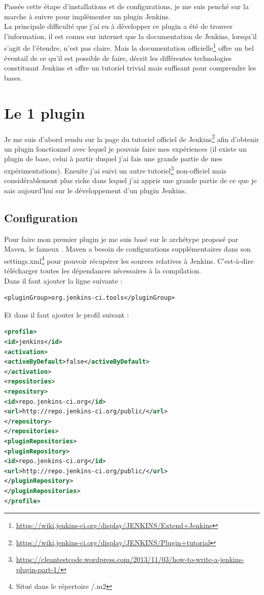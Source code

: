 \vspace{0.5cm}

Passée cette étape d'installations et de configurations, je me suis penché sur la marche à suivre pour implémenter un plugin Jenkins.\\
La principale difficulté que j'ai eu à développer ce plugin a été de trouver l'information, il est connu sur internet que la documentation de Jenkins, lorsqu'il s'agit de l'étendre, n'est pas claire. Mais la documentation officielle\footnote{\url{https://wiki.jenkins-ci.org/display/JENKINS/Extend+Jenkins}} offre un bel éventail de ce qu'il est possible de faire, décrit les différentes technologies constituant Jenkins et offre un tutoriel trivial mais suffisant pour comprendre les bases.\\



\section{Le 1 plugin}

Je me suis d'abord rendu sur la page du tutoriel officiel de Jenkins\footnote{\url{https://wiki.jenkins-ci.org/display/JENKINS/Plugin+tutorial}} afin d'obtenir un plugin fonctionnel avec lequel je pouvais faire mes expériences (il existe un plugin  de base, celui à partir duquel j'ai fais une grande partie de mes expérimentations). Ensuite j'ai suivi un autre tutoriel\footnote{\url{https://cleantestcode.wordpress.com/2013/11/03/how-to-write-a-jenkins-plugin-part-1/}} non-officiel mais considérablement plus riche dans lequel j'ai appris une grande partie de ce que je sais aujourd'hui sur le développement d'un plugin Jenkins.\\


\subsection{Configuration}
Pour faire mon premier plugin je me suis basé sur le archétype proposé par \gls{Maven}, le fameux . Maven a besoin de configurations supplémentaires dans son settings.xml\footnote{Situé dans le répertoire \texttildelow/.m2} pour pouvoir récupérer les sources relatives à Jenkins. C'est-à-dire télécharger toutes les dépendances nécessaires à la compilation.\\
Dans  il faut ajouter la ligne suivante :
\begin{lstlisting}
<pluginGroup>org.jenkins-ci.tools</pluginGroup>
\end{lstlisting}
Et dans  il faut ajouter le profil suivant :
\begin{lstlisting}[language=xml]
<profile>
<id>jenkins</id>
<activation>
<activeByDefault>false</activeByDefault>
</activation>
<repositories>
<repository>
<id>repo.jenkins-ci.org</id>
<url>http://repo.jenkins-ci.org/public/</url>
</repository>
</repositories>
<pluginRepositories>
<pluginRepository>
<id>repo.jenkins-ci.org</id>
<url>http://repo.jenkins-ci.org/public/</url>
</pluginRepository>
</pluginRepositories>
</profile>
\end{lstlisting}

